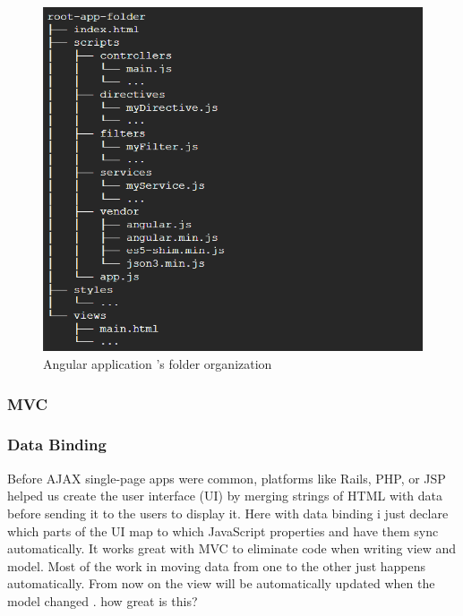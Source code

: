 \documentclass[14pt,a4paper]{extreport}
\begin{document}
		\begin{figure}
			\begin{center}
				\includegraphics[scale=0.5]{angular_organize.png}
				\caption{Angular application 's folder organization}
				\label{Angularfolder}
			\end{center}
		\end{figure}

			\subsubsection{MVC}
			\subsubsection{Data Binding}
			Before AJAX single-page apps were common, platforms like Rails, PHP, or JSP helped us create the user interface (UI) by merging strings of HTML with data before sending it to the users to display it. Here with data binding i just declare which parts of the UI map to which JavaScript properties and have them sync automatically. It works great with MVC to eliminate code when writing view and model. Most of the work in moving data from one to the other just happens automatically. From now on the view will be automatically updated when the model changed . how great is this?
\end{document}
